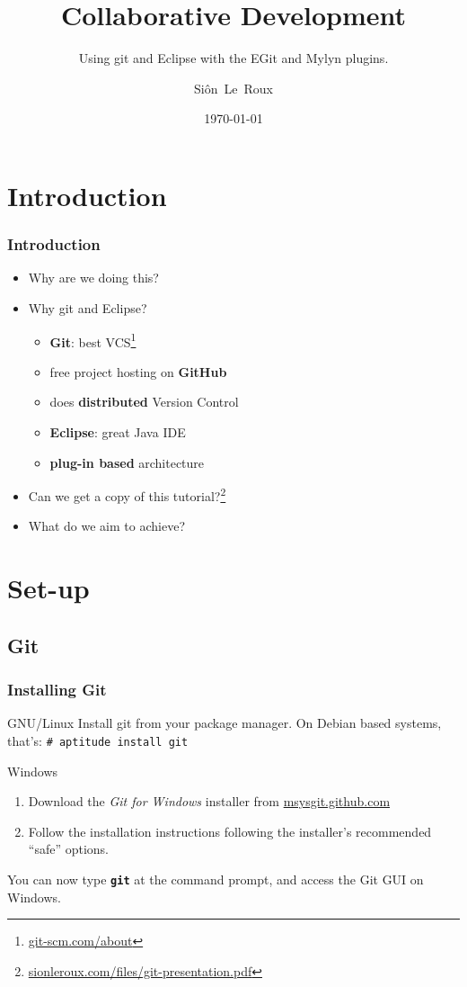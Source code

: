 \documentclass{beamer}
\title[Git \& Eclipse]{Collaborative Development}
\subtitle{Using git and Eclipse with the EGit and Mylyn plugins.}
\author{Si\^on~Le~Roux}
\date{\today}
\begin{document}
\begin{frame}
  \titlepage
\end{frame}

\section{Introduction}
\begin{frame}[<+->]
  \frametitle{Introduction}
  \begin{itemize}
  \item Why are we doing this?
  \item Why git and Eclipse?
    \begin{itemize}
    \item \textbf{Git}: best VCS\footnote{\href{http://git-scm.com/about}{git-scm.com/about}}
    \item free project hosting on \textbf{GitHub}
    \item does \textbf{distributed} Version Control
    \item \textbf{Eclipse}: great Java IDE
    \item \textbf{plug-in based} architecture
    \end{itemize}
  \item Can we get a copy of this tutorial?\footnote{\href{http://sionleroux.com/files/git-presentation.pdf}{sionleroux.com/files/git-presentation.pdf}}
  \item What do we aim to achieve?
  \end{itemize}
\end{frame}

\section{Set-up}
\subsection{Git}
\begin{frame}[<+->]
  \frametitle{Installing Git}
  \begin{block}{GNU/Linux}
  Install git from your package manager. On Debian based systems, that's: \texttt{\# aptitude install git}
  \end{block}
  \begin{block}{Windows}
  \begin{enumerate}
    \item Download the \emph{Git for Windows} installer from \href{http://msysgit.github.com}{msysgit.github.com}
    \item Follow the installation instructions following the installer's recommended ``safe'' options.
  \end{enumerate}
  \end{block}\pause
  You can now type \textbf{\texttt{git}} at the command prompt, and access the Git GUI on Windows.
\end{frame}
\end{document}
